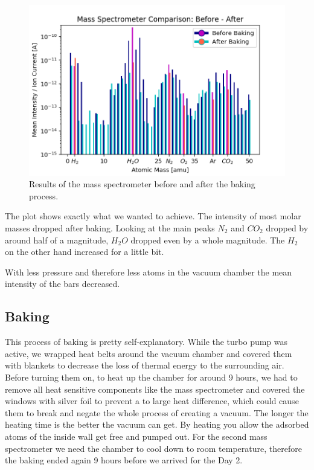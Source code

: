 \documentclass[]{article}
\begin{document}
\begin{figure}[h]
\centering\includegraphics[width=1\textwidth]{Plots/BeforeAfter.png}
\caption{Results of the mass spectrometer before and after the baking process.}
\label{fig::BeforeAfter}
\end{figure}

The plot shows exactly what we wanted to achieve. The intensity of most molar masses dropped after baking. Looking at the main peaks $N_2$ and $CO_2$ dropped by around half of a magnitude,  $H_2O$ dropped even by a whole magnitude. The $H_2$ on the other hand increased for a little bit.

With less pressure and therefore less atoms in the vacuum chamber the mean intensity of the bars decreased. 

\subsection{Baking}
This process of baking is pretty self-explanatory. While the turbo pump was active, we wrapped heat belts around the vacuum chamber and covered them with blankets to decrease the loss of thermal energy to the surrounding air. Before turning them on, to heat up the chamber for around 9 hours, we had to remove all heat sensitive components like the mass spectrometer and covered the windows with silver foil to prevent a to large heat difference, which could cause them to break and negate the whole process of creating a vacuum.
The longer the heating time is the better the vacuum can get. By heating you allow the adsorbed atoms of the inside wall get free and pumped out. 
For the second mass spectrometer we need the chamber to cool down to room temperature, therefore the baking ended again 9 hours before we arrived for the Day 2.
\end{document}
